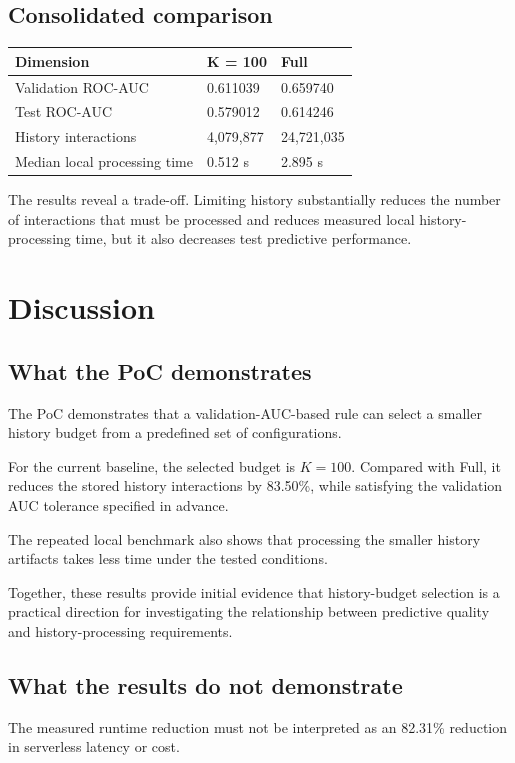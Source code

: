 \documentclass[11pt,a4paper]{article}
\begin{document}
\subsection{Consolidated comparison}
\begin{table}[htbp]
\centering
\begin{tabular}{lll}
\toprule
\textbf{Dimension} & \textbf{K = 100} & \textbf{Full} \\
\midrule
Validation ROC-AUC & 0.611039 & 0.659740 \\
Test ROC-AUC & 0.579012 & 0.614246 \\
History interactions & 4,079,877 & 24,721,035 \\
Median local processing time & 0.512 s & 2.895 s \\
\bottomrule
\end{tabular}
\end{table}

The results reveal a trade-off. Limiting history substantially reduces the number of interactions that must be processed and reduces measured local history-processing time, but it also decreases test predictive performance.

\section{Discussion}
\subsection{What the PoC demonstrates}
The PoC demonstrates that a validation-AUC-based rule can select a smaller history budget from a predefined set of configurations.

For the current baseline, the selected budget is $K = 100$. Compared with Full, it reduces the stored history interactions by 83.50\%, while satisfying the validation AUC tolerance specified in advance.

The repeated local benchmark also shows that processing the smaller history artifacts takes less time under the tested conditions.

Together, these results provide initial evidence that history-budget selection is a practical direction for investigating the relationship between predictive quality and history-processing requirements.

\subsection{What the results do not demonstrate}
The measured runtime reduction must not be interpreted as an 82.31\% reduction in serverless latency or cost.
\end{document}
